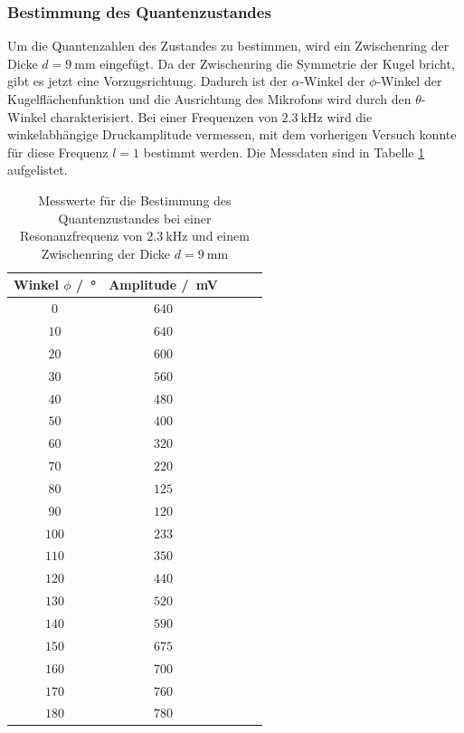 \subsubsection{Bestimmung des Quantenzustandes}
Um die Quantenzahlen des Zustandes zu bestimmen, wird ein Zwischenring der Dicke $d=\SI{9}{\milli\meter}$ eingefügt.
Da der Zwischenring die Symmetrie der Kugel bricht, gibt es jetzt eine Vorzugsrichtung. Dadurch ist der $\alpha$-Winkel der $\phi$-Winkel 
der Kugelflächenfunktion und die Ausrichtung des Mikrofons wird durch den $\theta$-Winkel charakterisiert.
Bei einer Frequenzen von $\SI{2.3}{\kilo\hertz}$ wird die winkelabhängige Druckamplitude vermessen, mit dem vorherigen Versuch konnte für diese Frequenz $l=1$ bestimmt werden. Die Messdaten sind in Tabelle
\ref{tab:Messdaten_9mmZwischenring} aufgelistet.
\FloatBarrier
\begin{table}
    \centering
    \caption{Messwerte für die Bestimmung des Quantenzustandes bei einer Resonanzfrequenz von $\SI{2.3}{\kilo\hertz}$ und einem Zwischenring der Dicke $d=\SI{9}{\milli\meter}$}
    \label{tab:Messdaten_9mmZwischenring}
    \begin{tabular}{c c c c c}
        \toprule
        Winkel $\phi$ /\SI{}{\degree}&Amplitude  /\SI{}{\milli\volt}\\
        \midrule
        $\num{0}$  &$\num{640}$ \\
        $\num{10}$ &$\num{640}$ \\
        $\num{20}$ &$\num{600}$ \\
        $\num{30}$ &$\num{560}$ \\
        $\num{40}$ &$\num{480}$ \\
        $\num{50}$ &$\num{400}$\\
        $\num{60}$ &$\num{320}$\\
        $\num{70}$ &$\num{220}$\\
        $\num{80}$ &$\num{125}$\\
        $\num{90}$ &$\num{120}$\\
        $\num{100}$&$\num{233}$\\
        $\num{110}$&$\num{350}$\\
        $\num{120}$&$\num{440}$\\
        $\num{130}$&$\num{520}$\\
        $\num{140}$&$\num{590}$\\
        $\num{150}$&$\num{675}$\\
        $\num{160}$&$\num{700}$\\
        $\num{170}$&$\num{760}$\\
        $\num{180}$&$\num{780}$\\
        \bottomrule
    \end{tabular}
\end{table}
